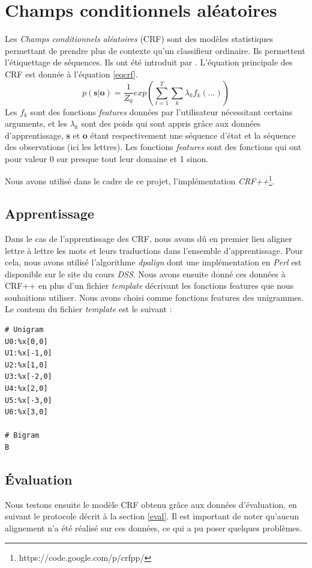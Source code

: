 \documentclass{article}
\begin{document}
\section{Champs conditionnels aléatoires}
Les \emph{Champs conditionnels aléatoires} (CRF) sont des modèles statistiques permettant de prendre plus de contexte qu'un classifieur ordinaire. Ils permettent l'étiquettage de séquences. Ils ont été introduit par \cite{Lafferty01}. L'équation principale des CRF est donnée à l'équation \ref{eqcrf}.
\begin{equation}
p(\textbf{s}|\textbf{o}) = \frac{1}{Z_0}exp(\sum_{t=1}^T\sum_k \lambda_k f_k(...))
\label{eqcrf}
\end{equation}
Les $f_k$ sont des fonctions \emph{features} données par l'utilisateur nécessitant certains arguments, et les $\lambda_k$ sont des poids qui sont appris grâce aux données d'apprentissage, \textbf{s} et \textbf{o} étant respectivement une séquence d'état et la séquence des observations (ici les lettres). Les fonctions \emph{features} sont des fonctions qui ont pour valeur 0 sur presque tout leur domaine et 1 sinon.

Nous avons utilisé dans le cadre de ce projet, l'implémentation \emph{CRF++}\footnote{https://code.google.com/p/crfpp/}.

\subsection{Apprentissage}
Dans le cas de l'apprentissage des CRF, nous avons dû en premier lieu aligner lettre à lettre les mots et leurs traductions dans l'ensemble d'apprentissage. Pour cela, nous avons utilisé l'algorithme \emph{dpalign} dont une implémentation en \emph{Perl} est disponible sur le site du cours \emph{DSS}. Nous avons ensuite donné ces données à CRF++ en plus d'un fichier \emph{template} décrivant les fonctions features que nous souhaitions utiliser. Nous avons choisi comme fonctions features des unigrammes. Le contenu du fichier \emph{template} est le suivant :
\begin{verbatim}
# Unigram
U0:%x[0,0]
U1:%x[-1,0]
U2:%x[1,0]
U3:%x[-2,0]
U4:%x[2,0]
U5:%x[-3,0]
U6:%x[3,0]

# Bigram
B
\end{verbatim}

\subsection{Évaluation}
Nous testons ensuite le modèle CRF obtenu grâce aux données d'évaluation, en suivant le protocole décrit à la section \ref{eval}. Il est important de noter qu'aucun alignement n'a été réalisé sur ces données, ce qui a pu poser quelques problèmes.
\end{document}
